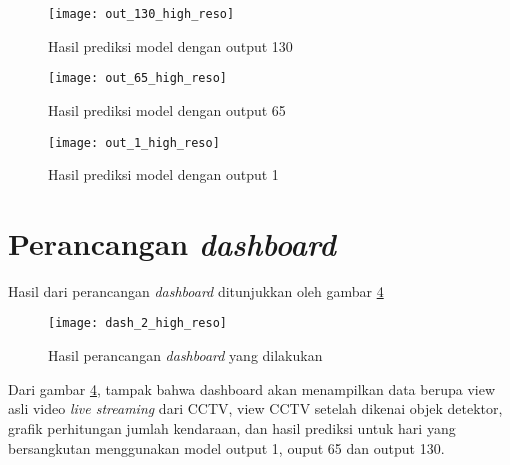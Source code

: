 \documentclass[../thesis.tex]{subfiles}
\begin{document}
\begin{figure}[htp]
	\centering
	\texttt{[image: out\_130\_high\_reso]}
	\caption{Hasil prediksi model dengan output 130}
	\label{out_130}
\end{figure}

\begin{figure}[htp]
	\centering
	\texttt{[image: out\_65\_high\_reso]}
	\caption{Hasil prediksi model dengan output 65}
	\label{out_65}
\end{figure}

\begin{figure}[htp]
	\centering
	\texttt{[image: out\_1\_high\_reso]}
	\caption{Hasil prediksi model dengan output 1}
	\label{out_1}
\end{figure}


\section{Perancangan \textit{dashboard}}
Hasil dari perancangan \textit{dashboard} ditunjukkan oleh gambar \ref{dash_result} 
\begin{figure}[htp]
	\centering
	\texttt{[image: dash\_2\_high\_reso]}
	\caption{Hasil perancangan \textit{dashboard} yang dilakukan}
	\label{dash_result}
\end{figure}
Dari gambar \ref{dash_result}, tampak bahwa dashboard akan menampilkan data berupa view asli video \textit{live streaming} dari CCTV, view CCTV setelah dikenai objek detektor, grafik perhitungan jumlah kendaraan, dan hasil prediksi untuk hari yang bersangkutan menggunakan model output 1, ouput 65 dan output 130.
\end{document}
